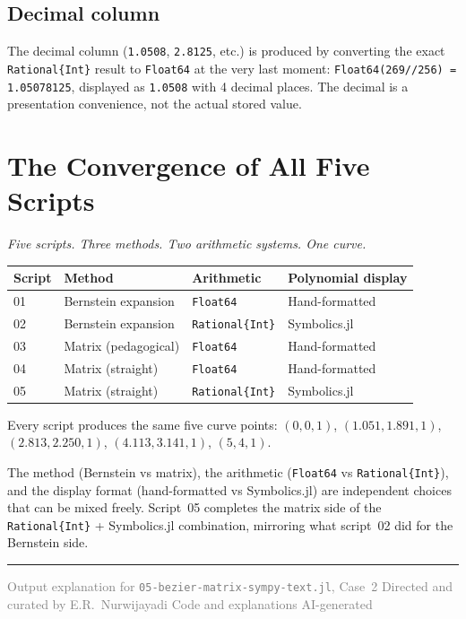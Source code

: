 \documentclass[12pt, a4paper]{article}
\newcommand{\cd}[1]{\texttt{#1}}
\begin{document}
\subsection{Decimal column}

The decimal column (\cd{1.0508}, \cd{2.8125}, etc.)
is produced by converting the exact \cd{Rational\{Int\}}
result to \cd{Float64} at the very last moment:
\cd{Float64(269//256) = 1.05078125}, displayed as \cd{1.0508}
with 4 decimal places.
The decimal is a presentation convenience, not the actual
stored value.


\section{The Convergence of All Five Scripts}

\textit{Five scripts. Three methods. Two arithmetic systems.
One curve.}

\begin{center}
\begin{tabular}{llll}
\toprule
Script & Method & Arithmetic & Polynomial display \\
\midrule
01 & Bernstein expansion & \cd{Float64} & Hand-formatted \\
02 & Bernstein expansion & \cd{Rational\{Int\}} & Symbolics.jl \\
03 & Matrix (pedagogical) & \cd{Float64} & Hand-formatted \\
04 & Matrix (straight) & \cd{Float64} & Hand-formatted \\
05 & Matrix (straight) & \cd{Rational\{Int\}} & Symbolics.jl \\
\bottomrule
\end{tabular}
\end{center}

Every script produces the same five curve points:
$(0,0,1)$, $(1.051, 1.891, 1)$, $(2.813, 2.250, 1)$,
$(4.113, 3.141, 1)$, $(5, 4, 1)$.

The method (Bernstein vs matrix), the arithmetic
(\cd{Float64} vs \cd{Rational\{Int\}}), and the display
format (hand-formatted vs Symbolics.jl) are independent
choices that can be mixed freely.
Script~05 completes the matrix side of the
\cd{Rational\{Int\}} + Symbolics.jl combination,
mirroring what script~02 did for the Bernstein side.

\vspace{2em}\hrule\vspace{0.5em}
{\small\textcolor{gray}{%
Output explanation for \texttt{05-bezier-matrix-sympy-text.jl}, Case~2
\textbar{} Directed and curated by E.R.\ Nurwijayadi
\textbar{} Code and explanations AI-generated}}
\end{document}
